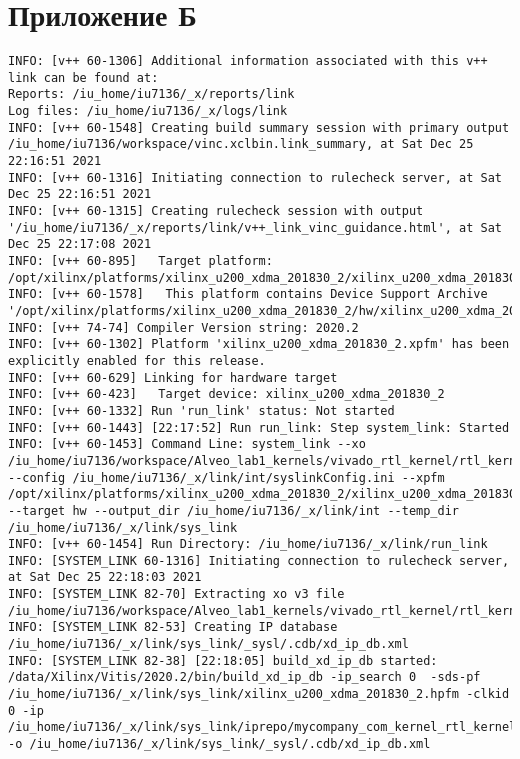 \chapter*{Приложение Б}

\begin{lstlisting}[label=lst:code_2,caption=Содержимое файла  v++*.log]
INFO: [v++ 60-1306] Additional information associated with this v++ link can be found at:
Reports: /iu_home/iu7136/_x/reports/link
Log files: /iu_home/iu7136/_x/logs/link
INFO: [v++ 60-1548] Creating build summary session with primary output /iu_home/iu7136/workspace/vinc.xclbin.link_summary, at Sat Dec 25 22:16:51 2021
INFO: [v++ 60-1316] Initiating connection to rulecheck server, at Sat Dec 25 22:16:51 2021
INFO: [v++ 60-1315] Creating rulecheck session with output '/iu_home/iu7136/_x/reports/link/v++_link_vinc_guidance.html', at Sat Dec 25 22:17:08 2021
INFO: [v++ 60-895]   Target platform: /opt/xilinx/platforms/xilinx_u200_xdma_201830_2/xilinx_u200_xdma_201830_2.xpfm
INFO: [v++ 60-1578]   This platform contains Device Support Archive '/opt/xilinx/platforms/xilinx_u200_xdma_201830_2/hw/xilinx_u200_xdma_201830_2.dsa'
INFO: [v++ 74-74] Compiler Version string: 2020.2
INFO: [v++ 60-1302] Platform 'xilinx_u200_xdma_201830_2.xpfm' has been explicitly enabled for this release.
INFO: [v++ 60-629] Linking for hardware target
INFO: [v++ 60-423]   Target device: xilinx_u200_xdma_201830_2
INFO: [v++ 60-1332] Run 'run_link' status: Not started
INFO: [v++ 60-1443] [22:17:52] Run run_link: Step system_link: Started
INFO: [v++ 60-1453] Command Line: system_link --xo /iu_home/iu7136/workspace/Alveo_lab1_kernels/vivado_rtl_kernel/rtl_kernel_wizard_0_ex/exports/rtl_kernel_wizard_0.xo --config /iu_home/iu7136/_x/link/int/syslinkConfig.ini --xpfm /opt/xilinx/platforms/xilinx_u200_xdma_201830_2/xilinx_u200_xdma_201830_2.xpfm --target hw --output_dir /iu_home/iu7136/_x/link/int --temp_dir /iu_home/iu7136/_x/link/sys_link
INFO: [v++ 60-1454] Run Directory: /iu_home/iu7136/_x/link/run_link
INFO: [SYSTEM_LINK 60-1316] Initiating connection to rulecheck server, at Sat Dec 25 22:18:03 2021
INFO: [SYSTEM_LINK 82-70] Extracting xo v3 file /iu_home/iu7136/workspace/Alveo_lab1_kernels/vivado_rtl_kernel/rtl_kernel_wizard_0_ex/exports/rtl_kernel_wizard_0.xo
INFO: [SYSTEM_LINK 82-53] Creating IP database /iu_home/iu7136/_x/link/sys_link/_sysl/.cdb/xd_ip_db.xml
INFO: [SYSTEM_LINK 82-38] [22:18:05] build_xd_ip_db started: /data/Xilinx/Vitis/2020.2/bin/build_xd_ip_db -ip_search 0  -sds-pf /iu_home/iu7136/_x/link/sys_link/xilinx_u200_xdma_201830_2.hpfm -clkid 0 -ip /iu_home/iu7136/_x/link/sys_link/iprepo/mycompany_com_kernel_rtl_kernel_wizard_0_1_0,rtl_kernel_wizard_0 -o /iu_home/iu7136/_x/link/sys_link/_sysl/.cdb/xd_ip_db.xml

\end{lstlisting}

